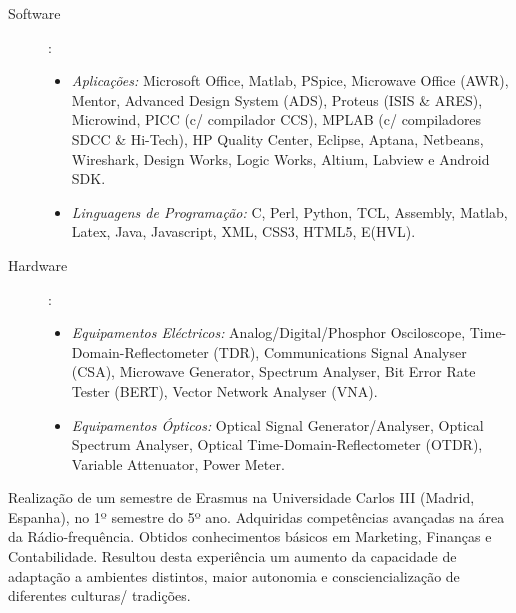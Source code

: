 \documentclass[15pt,helvetica,openbib,totpages,portuguese]{europecv}
\begin{document}
\begin{europecv}
{
\begin{description}
	\item[Software]:
	\begin{itemize}
		\item \textit{Aplicações:} Microsoft Office, Matlab, PSpice, Microwave Office (AWR), Mentor, Advanced Design System (ADS), Proteus (ISIS \& ARES), Microwind, PICC (c/ compilador CCS), MPLAB (c/ compiladores SDCC \& Hi-Tech), HP Quality Center, Eclipse, Aptana, Netbeans, Wireshark, Design Works, Logic Works, Altium, Labview e Android SDK.
		\item \textit{Linguagens de Programação:} C, Perl, Python, TCL, Assembly, Matlab, Latex, Java, Javascript, XML, CSS3, HTML5, E(HVL).
	\end{itemize}
	\item[Hardware]:
	\begin{itemize}
		\item \textit{Equipamentos Eléctricos:} Analog/Digital/Phosphor Osciloscope, Time-Domain-Reflectometer (TDR), Communications Signal Analyser (CSA), Microwave Generator, Spectrum Analyser, Bit Error Rate Tester (BERT), Vector Network Analyser (VNA).
		\item \textit{Equipamentos Ópticos:} Optical Signal Generator/Analyser, Optical Spectrum Analyser, Optical Time-Domain-Reflectometer (OTDR), Variable Attenuator, Power Meter.
	\end{itemize}
\end{description}
}


{Realização de um semestre de Erasmus na Universidade Carlos III (Madrid, Espanha), no 1º semestre do 5º ano. \newline
Adquiridas competências avançadas na área da Rádio-frequência. \newline
Obtidos conhecimentos básicos em Marketing, Finanças e Contabilidade. \newline
Resultou desta experiência um aumento da capacidade de adaptação a ambientes distintos, maior autonomia e consciencialização de diferentes culturas/ tradições.}

%

\end{europecv}
\end{document}
